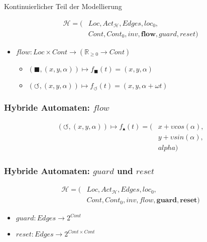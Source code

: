 \documentclass[ngerman]{beamer}
\begin{document}
\begin{section}{Kontinuierlicher Teil der Modellierung}
\begin{frame}
    \begin{align*}
        \mathcal{H} = ( & \mathit{Loc}, \mathit{Act}_{\mathcal{H}}, \mathit{Edges}, \mathit{loc}_0, \\
                        & \mathit{Cont}, \mathit{Cont}_0, \mathit{inv}, \mathbf{flow}, \mathit{guard}, \mathit{reset} )
    \end{align*}

    \begin{itemize}
        \item $\mathit{flow}: \mathit{Loc} \times \mathit{Cont} \rightarrow (\mathbb{R}_{\ge 0} \rightarrow \mathit{Cont}) $
            \begin{itemize}
                \item $(\blacksquare, (x, y, \alpha)) \mapsto f_\blacksquare(t) = (x, y, \alpha)$
                \item $(\circlearrowleft, (x, y, \alpha)) \mapsto f_\circlearrowleft(t) = (x, y, \alpha + \omega t)$
            \end{itemize}
    \end{itemize}
\end{frame}

\begin{frame}
    \frametitle{Hybride Automaten: $\mathit{flow}$}

    \begin{figure}
        \centering
        \def\svgwidth{0.6\columnwidth}
        
    \end{figure}

    \begin{align*}
        (\circlearrowleft, (x, y, \alpha)) \mapsto f_\blacktriangle(t) = ( & x + \upsilon cos(\alpha), \\
                                                                           & y + \upsilon sin(\alpha), \\
                                                                           & alpha )
    \end{align*}
\end{frame}

\begin{frame}
    \frametitle{Hybride Automaten: $\mathit{guard}$ und $\mathit{reset}$}

    \begin{align*}
        \mathcal{H} = ( & \mathit{Loc}, \mathit{Act}_{\mathcal{H}}, \mathit{Edges}, \mathit{loc}_0, \\
                        & \mathit{Cont}, \mathit{Cont}_0, \mathit{inv}, \mathit{flow}, \mathbf{guard}, \mathbf{reset} )
    \end{align*}

    \begin{itemize}
        \item $\mathit{guard}: \mathit{Edges} \rightarrow 2^{\mathit{Cont}}$
        \item $\mathit{reset}: \mathit{Edges} \rightarrow 2^{\mathit{Cont} \times \mathit{Cont}}$
    \end{itemize}
\end{frame}

\end{section}
\end{document}
